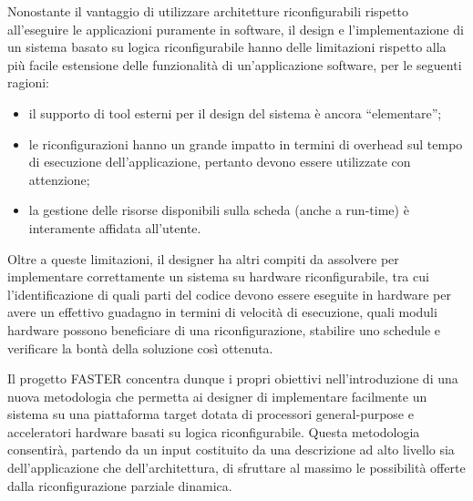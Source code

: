 Nonostante il vantaggio di utilizzare architetture riconfigurabili rispetto 
all'eseguire le applicazioni puramente in software, il design e 
l'implementazione di un sistema basato su logica riconfigurabile hanno delle 
limitazioni rispetto alla più facile estensione delle funzionalità di 
un'applicazione software, per le seguenti ragioni:
\begin{itemize}
 \item il supporto di tool esterni per il design del sistema è ancora 
``elementare'';
 \item le riconfigurazioni hanno un grande impatto in termini di overhead sul 
tempo di esecuzione dell'applicazione, pertanto devono essere utilizzate con 
attenzione;
 \item la gestione delle risorse disponibili sulla scheda (anche a run-time) è 
interamente affidata all'utente.
\end{itemize}
Oltre a queste limitazioni, il designer ha altri compiti da assolvere per 
implementare correttamente un sistema su hardware riconfigurabile, tra cui 
l'identificazione di quali parti del codice devono essere eseguite in hardware 
per avere un effettivo guadagno in termini di velocità di esecuzione, quali 
moduli hardware possono beneficiare di una riconfigurazione, stabilire uno 
schedule e verificare la bontà della soluzione così ottenuta.

Il progetto \ac{FASTER} concentra dunque i propri obiettivi nell'introduzione 
di una nuova metodologia che permetta ai designer di implementare facilmente un 
sistema su una piattaforma target dotata di processori general-purpose e 
acceleratori hardware basati su logica riconfigurabile. Questa metodologia 
consentirà, partendo da un input costituito da una descrizione ad alto livello 
sia dell'applicazione che dell'architettura, di sfruttare al massimo le 
possibilità offerte dalla riconfigurazione parziale dinamica.

